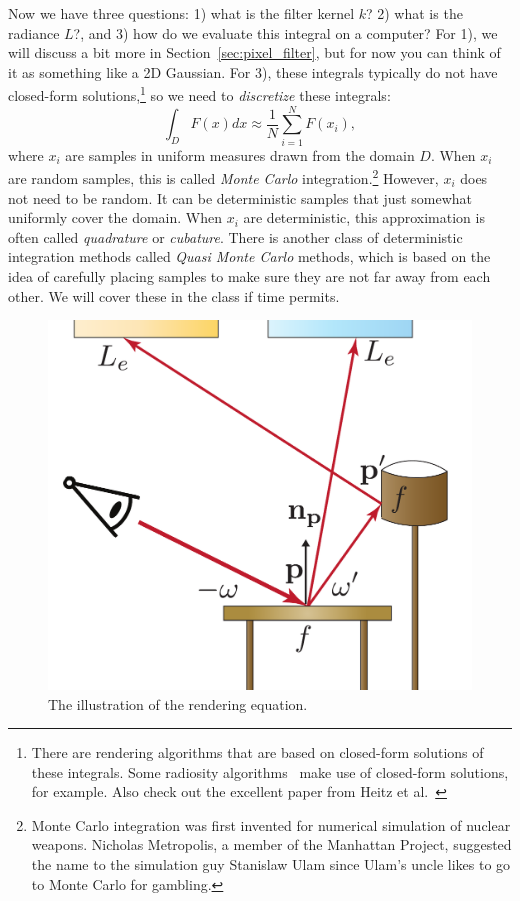 Now we have three questions: 1) what is the filter kernel $k$? 2) what is the radiance $L$?, and 3) how do we evaluate this integral on a computer? For 1), we will discuss a bit more in Section~\ref{sec:pixel_filter}, but for now you can think of it as something like a 2D Gaussian. For 3), these integrals typically do not have closed-form solutions,\footnote{There are rendering algorithms that are based on closed-form solutions of these integrals. Some radiosity algorithms~\cite{Schroder:1993:OFF} make use of closed-form solutions, for example. Also check out the excellent paper from Heitz et al.~\cite{Heitz:2016:RPS}} so we need to \emph{discretize} these integrals:
\begin{equation}
    \int_{D} F(x) dx \approx \frac{1}{N} \sum_{i=1}^{N} F(x_i),
    \label{eq:discretization}
\end{equation}
where $x_i$ are samples in uniform measures drawn from the domain $D$. When $x_i$ are random samples, this is called \emph{Monte Carlo} integration.\footnote{Monte Carlo integration was first invented for numerical simulation of nuclear weapons. Nicholas Metropolis, a member of the Manhattan Project, suggested the name to the simulation guy Stanislaw Ulam since Ulam's uncle likes to go to Monte Carlo for gambling.} However, $x_i$ does not need to be random. It can be deterministic samples that just somewhat uniformly cover the domain. When $x_i$ are deterministic, this approximation is often called \emph{quadrature} or \emph{cubature}. There is another class of deterministic integration methods called \emph{Quasi Monte Carlo} methods, which is based on the idea of carefully placing samples to make sure they are not far away from each other. We will cover these in the class if time permits.

\begin{figure}[h]
    \centering
    \includegraphics[width=0.4\linewidth]{imgs/pathtracing.pdf}
    \caption{The illustration of the rendering equation.}
    \label{fig:pathtracing}
\end{figure}

